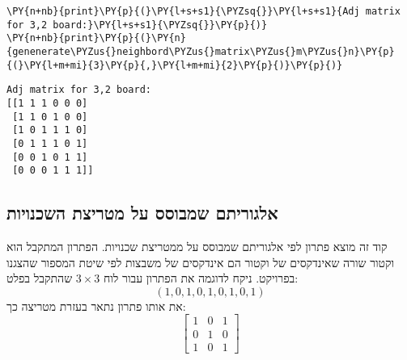 \begin{english}
\begin{tcolorbox}[breakable, size=fbox, boxrule=1pt, pad at break*=1mm,colback=cellbackground, colframe=cellborder]
\begin{Verbatim}[commandchars=\\\{\}]
\PY{n+nb}{print}\PY{p}{(}\PY{l+s+s1}{\PYZsq{}}\PY{l+s+s1}{Adj matrix for 3,2 board:}\PY{l+s+s1}{\PYZsq{}}\PY{p}{)}
\PY{n+nb}{print}\PY{p}{(}\PY{n}{genenerate\PYZus{}neighbord\PYZus{}matrix\PYZus{}m\PYZus{}n}\PY{p}{(}\PY{l+m+mi}{3}\PY{p}{,}\PY{l+m+mi}{2}\PY{p}{)}\PY{p}{)}
\end{Verbatim}
\end{tcolorbox}
    \begin{Verbatim}[commandchars=\\\{\}]
Adj matrix for 3,2 board:
[[1 1 1 0 0 0]
 [1 1 0 1 0 0]
 [1 0 1 1 1 0]
 [0 1 1 1 0 1]
 [0 0 1 0 1 1]
 [0 0 0 1 1 1]]
    \end{Verbatim}
\end{english}

\newpage
    \hypertarget{solver-based-on-adjacency-matrix}{%
\subsection{אלגוריתם שמבוסס על מטריצת השכנויות}\label{solver-based-on-adjacency-matrix}}
קוד זה מוצא פתרון לפי אלגוריתם שמבוסס על ממטריצת שכנויות.
הפתרון המתקבל הוא וקטור שורה שאינדקסים של וקטור הם 
אינדקסים של משבצות לפי שיטת המספור שהצגנו בפרויקט.
ניקח לדוגמה את הפתרון
עבור לוח 
$3 \times 3$
שהתקבל בפלט:
\[(1, 0, 1, 0, 1, 0, 1, 0, 1 )\]
את אותו פתרון נתאר בעזרת מטריצה כך:
\[
    \begin{bmatrix}
        1 & 0 & 1 \\
        0 & 1 & 0 \\
        1 & 0 & 1
    \end{bmatrix}
\]
